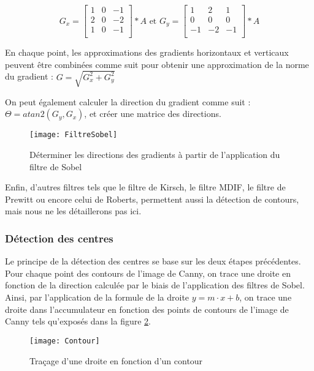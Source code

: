 $$G_x = 
\begin{bmatrix}
	1 & 0 & -1 \\
	2 & 0 & -2 \\
	1 & 0 & -1 \\
\end{bmatrix}
* A \text{ et } G_y =
\begin{bmatrix}
	1 & 2 & 1 \\
	0 & 0 & 0 \\
	-1 & -2 & -1 \\
\end{bmatrix}
* A
$$

En chaque point, les approximations des gradients horizontaux et verticaux peuvent être combinées comme suit pour obtenir une approximation de la norme du gradient : $G = \sqrt{G_x^2 + G_y^2}$

On peut également calculer la direction du gradient comme suit : $\Theta = atan2(G_y, G_x)$, et créer une matrice des directions.

\begin{figure}[h]
  \centering
  \texttt{[image: FiltreSobel]}
  \caption{Déterminer les directions des gradients à partir de l’application du filtre de Sobel}
  \label{fig:FiltreSobel}
\end{figure}

Enfin, d’autres filtres tels que le filtre de Kirsch, le filtre MDIF, le filtre de Prewitt ou encore celui de Roberts, permettent aussi la détection de contours, mais nous ne les détaillerons pas ici.

\subsubsection{Détection des centres}

Le principe de la détection des centres se base sur les deux étapes précédentes. Pour chaque point des contours de l’image de Canny, on trace une droite en fonction de la direction calculée par le biais de l’application des filtres de Sobel. Ainsi, par l’application de la formule de la droite $y = m \cdot x + b$, on trace une droite dans l’accumulateur en fonction des points de contours de l’image de Canny tels qu’exposés dans la figure \ref{fig:Contour}.

\begin{figure}[h]
  \centering
  \texttt{[image: Contour]}
  \caption{Traçage d’une droite en fonction d’un contour}
  \label{fig:Contour}
\end{figure}

